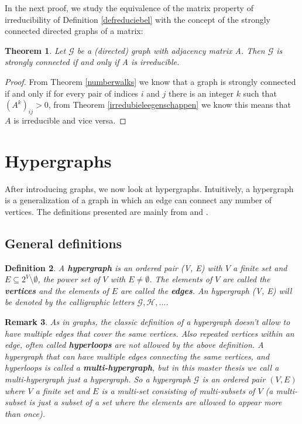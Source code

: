 \documentclass[a4paper,11pt]{report}
\newtheorem{theorem}{Theorem}[section]
\newtheorem{definition}[theorem]{Definition}
\newtheorem{remark}[theorem]{Remark}
\newcommand{\graf}{\mathscr{G}}
\newcommand{\hgraf}{\mathcal{G}}
\begin{document}
In the next proof, we study the equivalence of the matrix property of 
irreducibility of  Definition \ref{defreduciebel} with the concept of the 
strongly connected directed graphs of a matrix:
\begin{theorem}
    Let $\graf$ be a (directed) graph with adjacency matrix A. Then $\graf$ is strongly connected if and only if A is irreducible.

\end{theorem}

\begin{proof}
From Theorem \ref{numberwalks} we know that a graph is strongly connected if and only if for every pair of indices $i$ and $j$ 
there is an integer $k$ such that $(A^k)_{ij} > 0$, from Theorem \ref{irredubieleegenschappen} we 
know this means that $A$ is irreducible and vice versa.

\end{proof}
\newpage
\section{Hypergraphs}
After introducing graphs, we now look at hypergraphs. Intuitively, a 
hypergraph is a generalization of a graph in which an edge can connect any 
number of vertices. The definitions presented are mainly from \cite{berge} and 
\cite{hypper}.

\subsection{General definitions}
\begin{definition}\label{defhypergraph}
  A \textbf{hypergraph} is an ordered pair (V, E) with $V$ a finite set 
and $E \subseteq 2^V \setminus \emptyset$, the power set of $V$ with $E \not= \emptyset$. The elements of $V$ are called
the \textbf{vertices} and the elements of $E$ are called the \textbf{edges}.
An hypergraph (V, E) will be denoted by the calligraphic letters $\mathcal{G}, \mathcal{H},\ldots$.  
  \end{definition}

\begin{remark}

  As in graphs, the classic definition of a hypergraph doesn't allow to have 
  multiple edges that cover the same vertices. Also repeated vertices within an edge, often called \textbf{hyperloops} are not allowed 
  by the above definition. A hypergraph that can have multiple edges connecting 
  the same vertices, and hyperloops is called a \textbf{multi-hypergraph}, but 
  in this master thesis we call a multi-hypergraph just a hypergraph. So a hypergraph $\hgraf$ is an ordered
 pair $(V,E)$ where $V$ a finite set and $E$ is a multi-set consisting of 
multi-subsets of $V$ (a multi-subset is just a subset of a set where the elements are 
allowed to appear more than once).
\end{remark}
\end{document}
